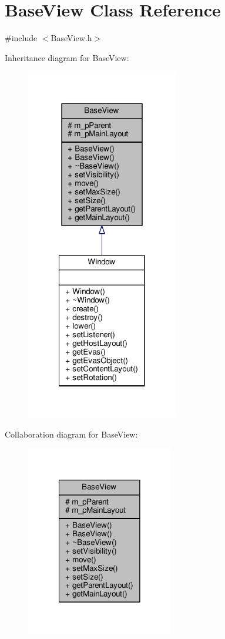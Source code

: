 \hypertarget{class_base_view}{\section{Base\-View Class Reference}
\label{class_base_view}
}


{\ttfamily \#include $<$Base\-View.\-h$>$}



Inheritance diagram for Base\-View\-:\nopagebreak
\begin{figure}[H]
\begin{center}
\leavevmode
\includegraphics[width=188pt]{class_base_view__inherit__graph}
\end{center}
\end{figure}


Collaboration diagram for Base\-View\-:
\nopagebreak
\begin{figure}[H]
\begin{center}
\leavevmode
\includegraphics[width=182pt]{class_base_view__coll__graph}
\end{center}
\end{figure}

